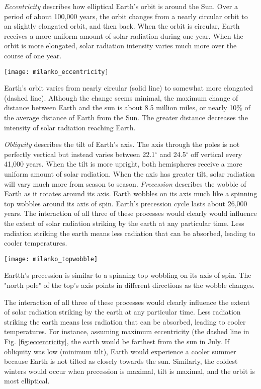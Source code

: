 \documentclass{tufte-handout}
\begin{document}
\textit{Eccentricity} describes how elliptical Earth's orbit is around the Sun. Over a period of about 100,000 years, the orbit changes from a nearly circular orbit to an slightly elongated orbit, and then back. When the orbit is circular, Earth receives a more uniform amount of solar radiation during one year.  When the orbit is more elongated, solar radiation intensity varies much more over the course of one year.  
\begin{marginfigure}%
	\begin{center}
		\texttt{[image: milanko\_eccentricity]}
	\end{center}
	\caption{Earth's orbit varies from nearly circular (solid line) to somewhat more elongated (dashed line). Although the change seems minimal, the maximum change of distance between Earth and the sun is about 8.5 million miles, or nearly 10\% of the average distance of Earth from the Sun. The greater distance decreases the intensity of solar radiation reaching Earth.}
	\label{fig:eccentricity}
\end{marginfigure} 
\textit{Obliquity} describes the tilt of Earth's axis. The axis through the poles is not perfectly vertical but instead varies between 22.1$^{\circ}$ and 24.5$^{\circ}$ off vertical every 41,000 years. When the tilt is more upright, both hemispheres receive a more uniform amount of solar radiation. When the axis has greater tilt, solar radiation will vary much more from season to season.  \textit{Precession} describes the wobble of Earth as it rotates around its axis.  Earth wobbles on its axis much like a spinning top wobbles around its axis of spin. Earth's precession cycle lasts about 26,000 years. The interaction of all three of these processes would clearly would influence the extent of solar radiation striking by the earth at any particular time.  Less radiation striking the earth means less radiation that can be absorbed, leading to cooler temperatures.
\begin{marginfigure}%
	\texttt{[image: milanko\_topwobble]}
	\caption{Eartth's precession is similar to a spinning top wobbling on its axis of spin. The "north pole" of the top's axis points in different directions as the wobble changes.}
	\label{fig:topwobble}
\end{marginfigure}
The interaction of all three of these processes would clearly influence the extent of solar radiation striking by the earth at any particular time.  Less radiation striking the earth means less radiation that can be absorbed, leading to cooler temperatures. For instance, assuming maximum eccentricity (the dashed line in Fig. \ref{fig:eccentricity}, the earth would be farthest from the sun in July.  If obliquity was low (minimum tilt), Earth would experience a cooler summer because Earth is not tilted as closely towards the sun.  Similarly, the coldest winters would occur when precession is maximal, tilt is maximal, and the orbit is most elliptical.
\end{document}
